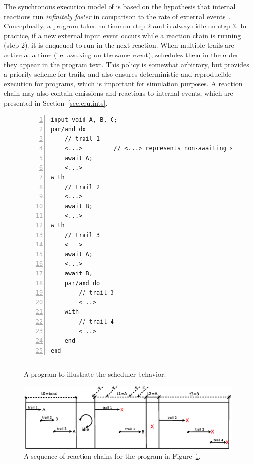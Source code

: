 The synchronous execution model of \CEU is based on the hypothesis that 
internal reactions run \emph{infinitely faster} in comparison to the rate of 
external events~\cite{rp.hypothesis}.
Conceptually, a program takes no time on step 2 and is always idle on step 3.
In practice, if a new external input event occurs while a reaction chain is 
running (step 2), it is enqueued to run in the next reaction.
%
%
When multiple trails are active at a time (i.e. awaking on the same event), 
\CEU schedules them in the order they appear in the program text.
This policy is somewhat arbitrary, but provides a priority scheme for trails, 
and also ensures deterministic and reproducible execution for programs, which 
is important for simulation purposes.
A reaction chain may also contain emissions and reactions to internal events, 
which are presented in Section~\ref{sec.ceu.ints}.

\begin{figure}[h]
\begin{lstlisting}[numbers=left,xleftmargin=2em]
input void A, B, C;
par/and do
    // trail 1
    <...>         // <...> represents non-awaiting statements
    await A;
    <...>
with
    // trail 2
    <...>
    await B;
    <...>
with
    // trail 3
    <...>
    await A;
    <...>
    await B;
    par/and do
        // trail 3
        <...>
    with
        // trail 4
        <...>
    end
end
\end{lstlisting}
%
\rule{14cm}{0.37pt}
\caption{ A \CEU program to illustrate the scheduler behavior.
{\small %
}%
\label{lst.reaction}
}
\end{figure}

\begin{figure}[h]
\centering
\includegraphics[scale=0.45]{reaction}
\caption{ A sequence of reaction chains for the program in 
Figure~\ref{lst.reaction}.
\label{fig.reaction}
}
\end{figure}

